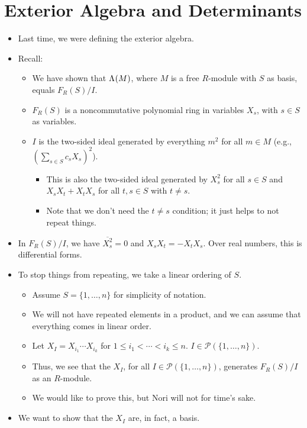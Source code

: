 \documentclass[../notes.tex]{subfiles}
\begin{document}
\section{Exterior Algebra and Determinants}
\begin{itemize}
    \item {}Last time, we were defining the exterior algebra.
    \item Recall:
    \begin{itemize}
        \item We have shown that $\Lambda^{}(M)$, where $M$ is a free $R$-module with $S$ as basis, equals $F_R(S)/I$.
        \item $F_R(S)$ is a noncommutative polynomial ring in variables $X_s$, with $s\in S$ as variables.
        \item $I$ is the two-sided ideal generated by everything $m^2$ for all $m\in M$ (e.g., $(\sum_{s\in S}c_sX_s)^2$).
        \begin{itemize}
            \item This is also the two-sided ideal generated by $X_s^2$ for all $s\in S$ and $X_sX_t+X_tX_s$ for all $t,s\in S$ with $t\neq s$.
            \item Note that we don't need the $t\neq s$ condition; it just helps to not repeat things.
        \end{itemize}
    \end{itemize}
    \item In $F_R(S)/I$, we have $\overline{X_s^2}=0$ and $X_sX_t=-X_tX_s$. Over real numbers, this is differential forms.
    \item To stop things from repeating, we take a linear ordering of $S$.
    \begin{itemize}
        \item Assume $S=\{1,\dots,n\}$ for simplicity of notation.
        \item We will not have repeated elements in a product, and we can assume that everything comes in linear order.
        \item Let $X_I=X_{i_1}\cdots X_{i_k}$ for $1\leq i_1<\cdots<i_k\leq n$. $I\in\mathcal{P}(\{1,\dots,n\})$.
        \item Thus, we see that the $X_I$, for all $I\in\mathcal{P}(\{1,\dots,n\})$, generates $F_R(S)/I$ as an $R$-module.
        \item We would like to prove this, but Nori will not for time's sake.
    \end{itemize}
    \item We want to show that the $X_I$ are, in fact, a basis.

\end{itemize}
\end{document}
